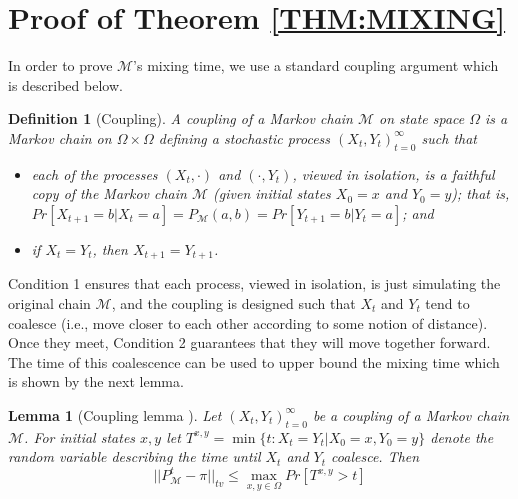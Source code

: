 \documentclass{acm_proc_article-sp}
\theoremstyle{plain}
\newtheorem{definition}{Definition}
\theoremstyle{plain}
\theoremstyle{plain}
\theoremstyle{plain}
\theoremstyle{plain}
\newtheorem{lemma}{Lemma}
\theoremstyle{plain}
\newcommand{\mc}[1]{\mathcal{#1}}
\begin{document}
\section{Proof of Theorem \ref{THM:MIXING}}


In order to prove $\mathcal{M}$'s mixing time, we use a standard coupling argument which is described below.

\begin{definition}[Coupling]
\label{def:coupling}
A coupling of a Markov chain $\mathcal{M}$ on state space $\Omega$ is a Markov chain on $\Omega \times \Omega$ defining a stochastic process  $(X_t,Y_t)_{t=0}^{\infty}$ such that
\begin{itemize}
\item each of the processes $(X_t,\cdot)$ and $(\cdot,Y_t)$, viewed in isolation, is a faithful copy of the Markov chain $\mathcal{M}$ (given initial states $X_0 = x$ and $Y_0 = y$); that is, $Pr[X_{t+1} = b|X_t = a] = P_{\mathcal{M}}(a,b) = Pr[Y_{t+1} = b|Y_t = a]$;
and
\item if $X_t =Y_t$, then $X_{t+1} =Y_{t+1}$.
\end{itemize}
\end{definition}

Condition 1 ensures that each process, viewed in isolation, is just simulating the original chain $\mathcal{M}$, and the coupling is designed such that $X_t$ and $Y_t$ tend to coalesce (i.e., move closer to each other according to some notion of distance). Once they meet, Condition 2 guarantees that they will move together forward. The time of this coalescence can be used to upper bound the mixing time which is shown by the next lemma.

\begin{lemma}[Coupling lemma \cite{LevinPW09mixing}]
\label{lem:coupling}
Let $(X_t,Y_t)_{t=0}^{\infty}$ be a coupling of a Markov chain $\mathcal{M}$. 
For initial states $x,y$ let
$T^{x,y} = \min\{ t : X_t = Y_t| X_0 =x, Y_0 = y \}$
denote the random variable describing the time until $X_t$ and $Y_t$ coalesce. Then
$$
||P^t_{\mc{M}} - \pi||_{\mathit{tv}} \leq  \max_{x,y \in \Omega}Pr[T^{x,y} > t] 
$$
\end{lemma}
\end{document}
